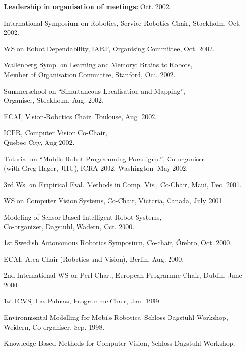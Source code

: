 \documentclass{article}
\begin{document}
\begin{cv}
\begin{cvlist}{\bf Leadership in organisation of meetings:}
		\cftdotfill{\cftdotsep} Oct. 2002.
		\item International Symposium on Robotics, Service Robotics Chair, Stockholm,
		\cftdotfill{\cftdotsep} Oct. 2002.
		\item WS on Robot Dependability, IARP, Organising Committee,
		\cftdotfill{\cftdotsep} Oct. 2002.
		\item Wallenberg Symp. on Learning and Memory: Brains to Robots,\\
		Member of Organisation Committee, Stanford, \cftdotfill{\cftdotsep} Oct. 2002.
		\item Summerschool on ``Simultaneous Localisation and Mapping'', \\Organiser,
		Stockholm, \cftdotfill{\cftdotsep}Aug. 2002.
		\item ECAI, Vision-Robotics Chair, Toulouse, \cftdotfill{\cftdotsep} Aug.
		2002.
		\item ICPR, Computer Vision Co-Chair,\\ Quebec City, \cftdotfill{\cftdotsep}
		Aug 2002.
		\item Tutorial on ``Mobile Robot Programming Paradigms'', Co-organiser\\ (with
		Greg Hager, JHU), ICRA-2002, Washington, \cftdotfill{\cftdotsep}May 2002.
		\item 3rd Ws. on Empirical Eval. Methods in Comp. Vis., Co-Chair, Maui,
		\cftdotfill{\cftdotsep} Dec. 2001.
		\item WS on Computer Vision Systems, Co-Chair, Victoria,
		Canada,\cftdotfill{\cftdotsep} July 2001
		\item Modeling of Sensor Based Intelligent Robot Systems,\\
		Co-organizer, Dagstuhl, Wadern, \cftdotfill{\cftdotsep} Oct. 2000.
		\item 1st Swedish Autonomous Robotics Symposium, Co-chair, \"Orebro,
		\cftdotfill{\cftdotsep}Oct. 2000.
		\item ECAI, Area Chair (Robotics and Vision), Berlin, \cftdotfill{\cftdotsep}
		Aug. 2000.
		\item 2nd International WS on Perf Char., European Programme Chair,
		Dublin,\cftdotfill{\cftdotsep} June 2000.
		\item 1st ICVS, Las Palmas, Programme Chair, \cftdotfill{\cftdotsep} Jan.
		1999.
		\item Environmental Modelling for Mobile Robotics, Schloss Dagstuhl
		Workshop,\\ Weidern, Co-organiser, \cftdotfill{\cftdotsep} Sep. 1998.
		\item Knowledge Based Methods for Computer Vision, Schloss Dagstuhl Workshop,

\end{cvlist}
\end{cv}
\end{document}
